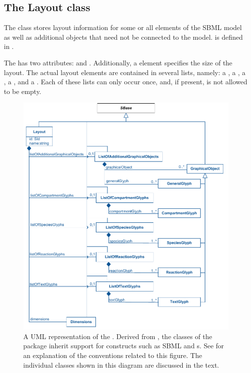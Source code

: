 \subsection{The Layout class}
\label{layout-class}
The \LayoutClass class stores layout information for some or all elements of 
the SBML model as well as additional objects that need not be connected 
to the model. \LayoutClass is defined in .

The \LayoutClass has two attributes:  and 
. Additionally, a \Dimensions element specifies the size of 
the layout. The actual layout elements are contained in several lists,
namely: a \ListOfCompartmentGlyphs, a \ListOfSpeciesGlyphs, a 
\ListOfReactionGlyphs, a \ListOfTextGlyphs, and a 
\ListOfAdditionalGraphicalObjects. Each of these lists can only occur 
once, and, if present, is not allowed to be empty. 


\begin{figure}[!ht]
\vspace*{-0.5em}
\includegraphics{uml/layout-layout-uml}
\vspace*{-0.5em}
\caption{A UML representation of the \LayoutPackage. Derived from 
\SBase, the classes of the \Layout package inherit support for constructs such as SBML 
\Notes and \Annotation{}s. See  for an explanation of the conventions related 
to this figure. The individual classes shown in this diagram are discussed in the 
text.} 
\label{figure:layout_uml}
\end{figure}

